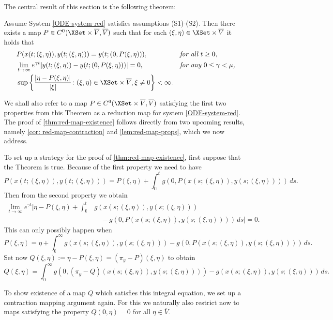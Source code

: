 \documentclass[a4paper]{siamart190516}
\begin{document}
The central result of this section is the following theorem:
 \begin{theorem}\label{thm:red-map-existence}
Assume System \cref{ODE-system-red} satisfies assumptions (S1)-(S2). Then there
exists a map $P \in C^0(\XSet \times \overline{V}, \overline{V})$ such that for each
$(\xi,\eta) \in \XSet \times \overline{V}$ it holds that 
\[
  \begin{aligned}
    & P(x(t; (\xi,\eta)),y(t;(\xi,\eta))) = y(t; (0,P(\xi,\eta))),  
      && \textit{for all $t \geq 0$,} \\
    & \lim_{t \rightarrow \infty} e^{\gamma t}  | y(t;(\xi,\eta)) - y(t; (0,P(\xi,\eta))) | = 0,
      && \textit{for any $0 \leq \gamma < \mu $,} \\
    & \sup \left\{ \frac{|\eta - P(\xi,\eta)|}{|\xi|} 
      \colon (\xi,\eta) \in \XSet \times \overline{V}, \xi \neq 0   \right\} < \infty.
  \end{aligned}
\]
 \end{theorem}
 We shall also refer to a map $P \in C^0(\XSet \times \overline{V}, \overline{V})$
 satisfying the first two properties from this Theorem as a reduction map for system
 \cref{ODE-system-red}. The proof of \cref{thm:red-map-existence} follows directly from two upcoming
 results, namely \cref{cor: red-map-contraction} and \cref{lem:red-map-props}, which
 we now address. 
 
 To set up a strategy for the proof of \cref{thm:red-map-existence}, first suppose that the Theorem is true. 
 Because of the first property we need to have
 \[
 P(x(t; (\xi,\eta)),y(t;(\xi,\eta))) = P(\xi,\eta) +\int_0^t g(0, P(x(s; (\xi,\eta)),y(s;(\xi,\eta))) ) \, ds.
 \]
 Then from the second property we obtain
 \begin{align*}
 \lim_{t \rightarrow \infty} e^{\gamma t}  \Big| \eta - P(\xi,\eta) + \int_0^t &g(x(s; (\xi,\eta)),y(s;(\xi,\eta))) \\
  &\quad - g(0, P(x(s; (\xi,\eta)),y(s;(\xi,\eta))) ) \, ds \Big| = 0.
 \end{align*}
 This can only possibly happen when
 \[
 P(\xi,\eta) = \eta + \int_0^{\infty} g(x(s; (\xi,\eta)),y(s;(\xi,\eta))) - g(0, P(x(s; (\xi,\eta)),y(s;(\xi,\eta))) ) \, ds.
 \]
 Set now $Q(\xi,\eta) :=  \eta - P(\xi,\eta) = (\pi_y - P)(\xi,\eta)$ to obtain
 \[
 Q(\xi,\eta) = \int_0^{\infty} g(0, (\pi_y -Q)(x(s; (\xi,\eta)),y(s;(\xi,\eta)))) - g(x(s; (\xi,\eta)),y(s;(\xi,\eta))) \, ds.
 \]
 
 To show existence of a map $Q$ which satisfies this integral equation, we set up a contraction mapping argument again. For this we naturally also restrict now to maps satisfying the property $Q(0,\eta) = 0$ for all $\eta \in \overline{V}$. 
 
\end{document}
